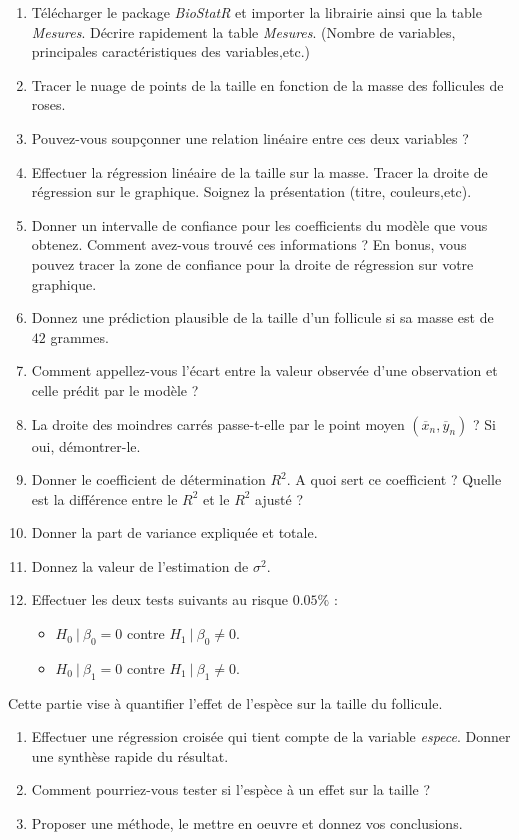 \begin{enumerate}
\item Télécharger le package \textit{BioStatR} et importer la librairie ainsi que la table \textit{Mesures}. Décrire rapidement la table \textit{Mesures}. (Nombre de variables, principales caractéristiques des variables,etc.)
\item Tracer le nuage de points de la taille en fonction de la masse des follicules de roses.
\item Pouvez-vous soupçonner une relation linéaire entre ces deux variables ?
\item Effectuer la régression linéaire de la taille sur la masse. Tracer la droite de régression sur le graphique. Soignez la présentation (titre, couleurs,etc). 
\item Donner un intervalle de confiance pour les coefficients du modèle que vous obtenez. Comment avez-vous trouvé ces informations ? En bonus, vous pouvez tracer la zone de confiance pour la droite de régression sur votre graphique.
\item Donnez une prédiction plausible de la taille d'un follicule si sa masse est de $42$ grammes.
\item Comment appellez-vous l'écart entre la valeur observée d'une observation et celle prédit par le modèle ?
\item La droite des moindres carrés passe-t-elle par le point moyen $(\overline x_n, \overline y_n)$ ? Si oui, démontrer-le.
\item Donner le coefficient de détermination $R^2$. A quoi sert ce coefficient ? Quelle est la différence entre le $R^2$ et le $R^2$ ajusté ?
\item Donner la part de variance expliquée et totale.
\item Donnez la valeur de l'estimation de $\sigma^2$.
\item Effectuer les deux tests suivants au risque $0.05\%$ :
\begin{itemize}
\item $H_0 \ | \ \beta_0 = 0$ contre $H_1 \ | \ \beta_0 \neq 0$.
\item $H_0 \ | \ \beta_1 = 0$ contre $H_1 \ | \ \beta_1 \neq 0$.
\end{itemize}
\end{enumerate}

Cette partie vise à quantifier l'effet de l'espèce sur la taille du follicule. 

\begin{enumerate}
\item Effectuer une régression croisée qui tient compte de la variable \textit{espece}. Donner une synthèse rapide du résultat.
\item Comment pourriez-vous tester si l'espèce à un effet sur la taille ? 
\item Proposer une méthode, le mettre en oeuvre et donnez vos conclusions.
\end{enumerate}